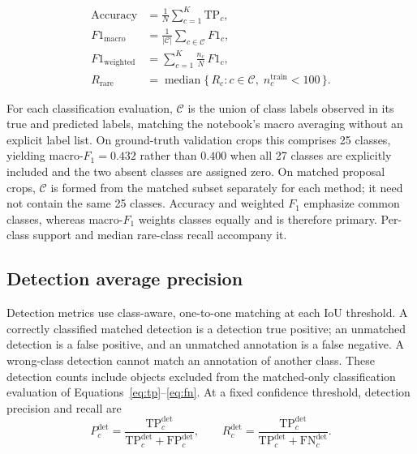 \documentclass[a4paper,8pt]{article}
\begin{document}
\begin{align}
\mathrm{Accuracy} &= \frac{1}{N}\sum_{c=1}^{K} \mathrm{TP}_c, \label{eq:acc}\\[2pt]
F1_{\mathrm{macro}} &= \frac{1}{|\mathcal{C}|}\sum_{c \in \mathcal{C}} F1_c, \label{eq:macrof1}\\[2pt]
F1_{\mathrm{weighted}} &= \sum_{c=1}^{K} \frac{n_c}{N}\, F1_c, \label{eq:weightedf1}\\[2pt]
R_{\mathrm{rare}} &= \operatorname{median}\bigl\{\, R_c : c \in \mathcal{C},\; n^{\mathrm{train}}_c < 100 \,\bigr\}. \label{eq:rarerecall}
\end{align}

For each classification evaluation, $\mathcal{C}$ is the union of class labels observed in
its true and predicted labels, matching the notebook's macro averaging without an explicit
label list. On ground-truth validation crops this comprises 25 classes, yielding
macro-$F_1=0.432$ rather than $0.400$ when all 27 classes are explicitly included and the
two absent classes are assigned zero. On matched proposal crops, $\mathcal{C}$ is formed
from the matched subset separately for each method; it need not contain the same 25 classes.
Accuracy and weighted $F_1$
emphasize common classes, whereas macro-$F_1$ weights classes equally and is therefore primary.
Per-class support and median rare-class recall accompany it.

\subsection{Detection average precision}
\label{sec:ap}

Detection metrics use class-aware, one-to-one matching at each IoU threshold. A correctly
classified matched detection is a detection true positive; an unmatched detection is a
false positive, and an unmatched annotation is a false negative. A wrong-class detection
cannot match an annotation of another class. These detection counts include objects excluded
from the matched-only classification evaluation of Equations~\eqref{eq:tp}--\eqref{eq:fn}.
At a fixed confidence threshold, detection precision and recall are
\begin{equation}
P_c^{\mathrm{det}} = \frac{\mathrm{TP}_c^{\mathrm{det}}}
{\mathrm{TP}_c^{\mathrm{det}}+\mathrm{FP}_c^{\mathrm{det}}}, \qquad
R_c^{\mathrm{det}} = \frac{\mathrm{TP}_c^{\mathrm{det}}}
{\mathrm{TP}_c^{\mathrm{det}}+\mathrm{FN}_c^{\mathrm{det}}}.
\label{eq:det-pr}
\end{equation}
\end{document}
